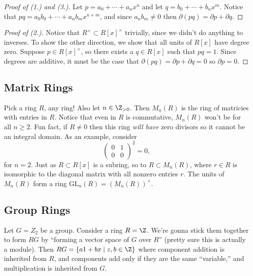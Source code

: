 \begin{proof}[Proof of (1.) and (3.)]
Let $p = a_0 + \cdots + a_nx^n$ and let $q = b_0 + \cdots + b_nx^m$. Notice that $pq = a_0b_0 + \cdots + a_nb_mx^{n+m}$, and since $a_nb_m \not= 0$ then $\partial(pq) = \partial p + \partial q$.
\end{proof}

\begin{proof}[Proof of (2.)]
Notice that $R^\times \subset R[x]^\times$ trivially, since we didn't do anything to inverses. To show the other direction, we show that all units of $R[x]$ have degree zero. Suppose $p \in R[x]^\times$, so there exists a $q \in R[x]$ such that $pq = 1$. Since degrees are additive, it must be the case that $\partial(pq) = \partial p + \partial q = 0$ so $\partial p = 0$.
\end{proof}

\subsection{Matrix Rings}

Pick a ring $R$, any ring! Also let $n \in \Z_{>0}$. Then $M_n(R)$ is the ring of matricies with entries in $R$. Notice that even in $R$ is commutative, $M_n(R)$ won't be for all $n \geq 2$. Fun fact, if $R \not= 0$ then this ring \emph{will have} zero divisors so it cannot be an integral domain. As an example, consider 
\[
\begin{pmatrix}
0 & 1  \\ 0 & 0
\end{pmatrix}^2 = 0,
\]
for $n = 2$. Just as $R \subset R[x]$ is a subring, so to $R \subset M_n(R)$, where $r \in R$ is isomorphic to the diagonal matrix with all nonzero entries $r$. The units of $M_n(R)$ form a ring $\mathrm{GL}_n(R) = \left(M_n(R)\right)^\times$.

\subsection{Group Rings}

\begin{example}
Let $G = Z_2$ be a group. Consider a ring $R = \Z$. We're gonna stick them together to form $RG$ by ``forming a vector space of $G$ over $R$'' (pretty sure this is actually a module). Then $RG = \{a1 + bx \mid z,b \in \Z\}$ where component addition is inherited from $R$, and components add only if they are the same ``variable,'' and multiplication is inherited from $G$.
\end{example}

